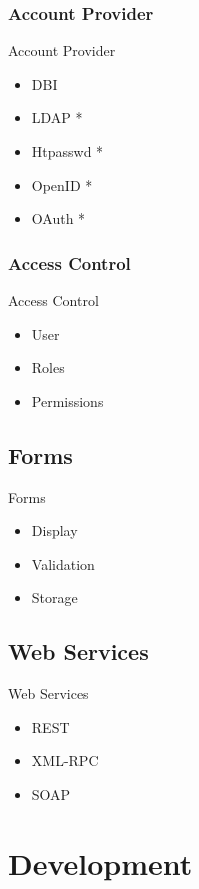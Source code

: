 \subsubsection{Account Provider}
\begin{frame}{Account Provider}
\begin{itemize}
\item DBI 
\item LDAP *
\item Htpasswd * 
\item OpenID *
\item OAuth *
\end{itemize}
\end{frame}

\subsubsection{Access Control}
\begin{frame}{Access Control}
\begin{itemize}
\item User
\item Roles
\item Permissions
\end{itemize}
\end{frame}

\subsection{Forms}
\begin{frame}{Forms}
\begin{itemize}
\item Display
\item Validation
\item Storage
\end{itemize}
\end{frame}

\subsection{Web Services}
\begin{frame}{Web Services}
\begin{itemize}
\item REST
\item XML-RPC
\item SOAP
\end{itemize}
\end{frame}

\section{Development}

